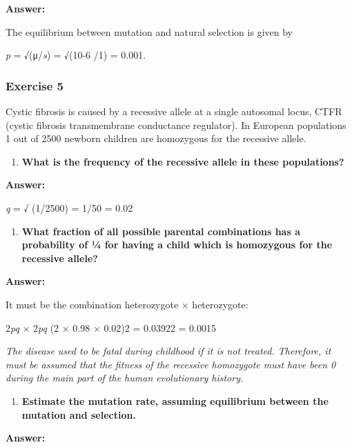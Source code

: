 \documentclass[]{article}
\providecommand{\tightlist}{%
  \setlength{\itemsep}{0pt}\setlength{\parskip}{0pt}}
\begin{document}
\textbf{Answer:}

The equilibrium between mutation and natural selection is given by

\emph{p} = √(μ/\emph{s}) = √(10-6 /1) = 0.001.

\hypertarget{exercise-5}{%
\subsubsection{Exercise 5}\label{exercise-5}}

Cystic fibrosis is caused by a recessive allele at a single autosomal
locus, CTFR (cystic fibrosis transmembrane conductance regulator). In
European populations 1 out of 2500 newborn children are homozygous for
the recessive allele.

\begin{enumerate}
\def\labelenumi{\arabic{enumi})}
\tightlist
\item
  \textbf{What is the frequency of the recessive allele in these
  populations?}
\end{enumerate}

\textbf{Answer:}

\emph{q} = √ (1/2500) = 1/50 = 0.02

\begin{enumerate}
\def\labelenumi{\arabic{enumi})}
\setcounter{enumi}{1}
\tightlist
\item
  \textbf{What fraction of all possible parental combinations has a
  probability of ¼ for having a child which is homozygous for the
  recessive allele?}
\end{enumerate}

\textbf{Answer:}

It must be the combination heterozygote × heterozygote:

2\emph{pq} × 2\emph{pq} (2 × 0.98 × 0.02)2 = 0.03922 = 0.0015

\emph{The disease used to be fatal during childhood if it is not
treated. Therefore, it must be assumed that the fitness of the recessive
homozygote must have been 0 during the main part of the human
evolutionary history.}

\begin{enumerate}
\def\labelenumi{\arabic{enumi})}
\setcounter{enumi}{2}
\tightlist
\item
  \textbf{Estimate the mutation rate, assuming equilibrium between the
  mutation and selection.}
\end{enumerate}

\textbf{Answer:}
\end{document}
